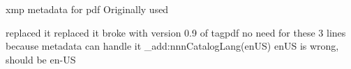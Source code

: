 
xmp metadata for pdf
Originally used \usepackage[a-2a]{pdfx}
\usepackage{hyperxmp} replaced it
\RequirePackage{pdfmanagement-testphase} replaced it
 broke with version 0.9 of tagpdf
\ExplSyntaxOn no need for these 3 lines because metadata can handle it
\pdfmanagement_add:nnn{Catalog}{Lang}{(enUS)} enUS is wrong, should be en-US
\ExplSyntaxOff
